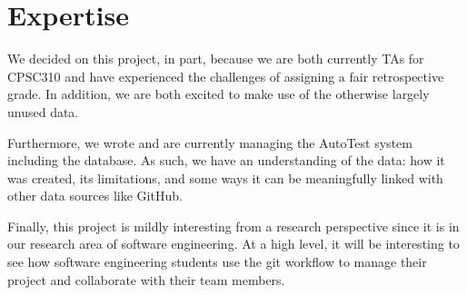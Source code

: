 \documentclass[preprint,journal]{vgtc}       %
\begin{document}

\section{Expertise}
We decided on this project, in part, because we are both currently TAs for CPSC310
and have experienced the challenges of assigning a fair retrospective grade. In
addition, we are both excited to make use of the otherwise largely unused data.

Furthermore, we wrote and are currently managing the AutoTest system including
the database. As such, we have an understanding of the data: how it was created,
its limitations, and some ways it can be meaningfully linked with other data sources
like GitHub.

Finally, this project is mildly interesting from a research perspective since it
is in our research area of software engineering. At a high level, it will be
interesting to see how software engineering students use the git workflow to
manage their project and collaborate with their team members.
\end{document}
